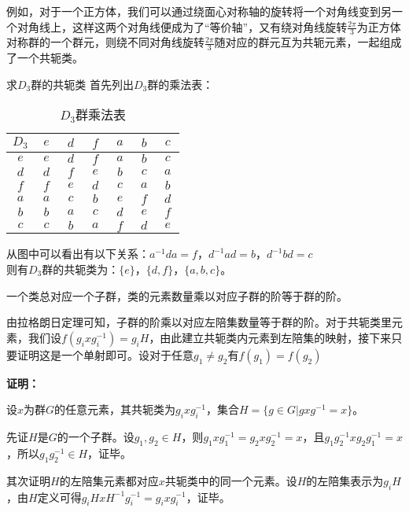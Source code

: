 例如，对于一个正方体，我们可以通过绕面心对称轴的旋转将一个对角线变到另一个对角线上，这样这两个对角线便成为了“等价轴”，又有绕对角线旋转$\frac{2\pi}{3}$为正方体对称群的一个群元，则绕不同对角线旋转$\frac{2\pi}{3}$随对应的群元互为共轭元素，一起组成了一个共轭类。

\begin{example}{求$D_3$群的共轭类}
首先列出$D_3$群的乘法表：
\begin{table}[ht]
\centering
\caption{$D_3$群乘法表}\label{tab_gpcon_1}
\begin{tabular}{|c|c|c|c|c|c|c|}
\hline
        $D_3$ & $~e~$ & $~d~$ & $~f~$ & $~a~$ & $~b~$ & $~c~$ \\ \hline
        $e$ & $e$ & $d$ & $f$ & $a$ & $b$ & $c$ \\ \hline
        $d$ & $d$ & $f$ & $e$ & $b$ & $c$ & $a$ \\ \hline
        $f$ & $f$ & $e$ & $d$ & $c$ & $a$ & $b$ \\ \hline
        $a$ & $a$ & $c$ & $b$ & $e$ & $f$ & $d$ \\ \hline
        $b$ & $b$ & $a$ & $c$ & $d$ & $e$ & $f$ \\ \hline
        $c$ & $c$ & $b$ & $a$ & $f$ & $d$ & $e$ \\ \hline
\end{tabular}
\end{table}

从图中可以看出有以下关系：$a^{-1}da=f$，$d^{-1}ad=b$，$d^{-1}bd=c$\\
则有$D_3$群的共轭类为：$\{e\}$，$\{d,f\}$，$\{a,b,c\}$。
\end{example}
\begin{theorem}{}
一个类总对应一个子群，类的元素数量乘以对应子群的阶等于群的阶。
\end{theorem}
由拉格朗日定理可知，子群的阶乘以对应左陪集数量等于群的阶。对于共轭类里元素，我们设$f(g_ixg_i^{-1})=g_iH$，由此建立共轭类内元素到左陪集的映射，接下来只要证明这是一个单射即可。设对于任意$g_1\neq g_2$有$f(g_1)=f(g_2)$

\textbf{证明：}

设$x$为群$G$的任意元素，其共轭类为$g_ixg_i^{-1}$，集合$H=\{ g\in G|gxg^{-1}=x\}$。

先证$H$是$G$的一个子群。设$g_1,g_2\in H$，则$g_1xg_1^{-1}=g_2xg_2^{-1}=x$，且$g_1g_2^{-1}xg_2g_1^{-1}=x$，所以$g_1g_2^{-1}\in H$，证毕。

其次证明$H$的左陪集元素都对应$x$共轭类中的同一个元素。设$H$的左陪集表示为$g_iH$，由$H$定义可得$g_iHxH^{-1}g_i^{-1}=g_ixg_i^{-1}$，证毕。


